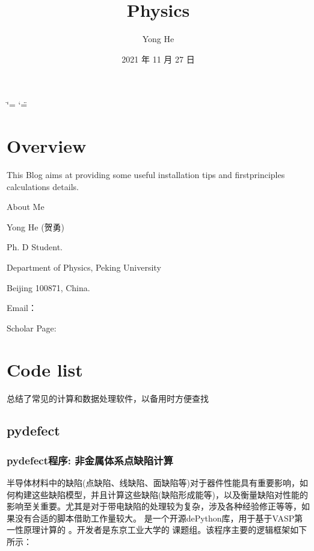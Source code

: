 \documentclass[a4paper,12pt,english]{sphinxmanual}
\title{Physics}
\date{2021 年 11 月 27 日}
\author{Yong He}
\begin{document}
\ifdefined\shorthandoff
  \ifnum\catcode`\=\string=\active\shorthandoff{=}\fi
  \ifnum\catcode`\"=\active{}\fi
\fi

\pagestyle{empty}
\sphinxmaketitle
\pagestyle{plain}
\sphinxtableofcontents
\pagestyle{normal}
\label{\detokenize{index::doc}}



\chapter{Overview}
\label{\detokenize{welcome:overview}}\label{\detokenize{welcome::doc}}
\sphinxAtStartPar
This Blog aims at providing some useful installation tips and first\sphinxhyphen{}principles calculations details.

\begin{DUlineblock}{0em}
\item[] About Me
\item[] Yong He (贺勇)
\item[] Ph. D Student.
\item[] Department of Physics, Peking University
\item[] Beijing 100871, China.
\item[] E\sphinxhyphen{}mail：
\item[] Scholar Page: 
\end{DUlineblock}


\chapter{Code list}
\label{\detokenize{code:code-list}}\label{\detokenize{code::doc}}
\sphinxAtStartPar
总结了常见的计算和数据处理软件，以备用时方便查找


\section{pydefect}
\label{\detokenize{code:pydefect}}

\subsection{pydefect程序: 非金属体系点缺陷计算}
\label{\detokenize{code/pydefect:pydefect}}\label{\detokenize{code/pydefect::doc}}
\sphinxAtStartPar
{}

\sphinxAtStartPar
半导体材料中的缺陷(点缺陷、线缺陷、面缺陷等)对于器件性能具有重要影响，如何构建这些缺陷模型，并且计算这些缺陷(缺陷形成能等)，以及衡量缺陷对性能的影响至关重要。尤其是对于带电缺陷的处理较为复杂，涉及各种经验修正等等，如果没有合适的脚本借助工作量较大。  是一个开源dePython库，用于基于VASP第一性原理计算的  。开发者是东京工业大学的  课题组。该程序主要的逻辑框架如下所示：
\end{document}
